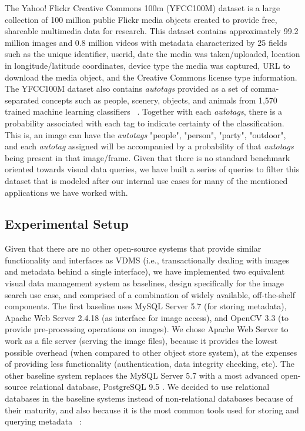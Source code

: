 The Yahoo! Flickr Creative Commons 100m (YFCC100M) dataset is a large
collection of 100 million public Flickr media objects created to provide free,
shareable multimedia data for research.
This dataset contains approximately 99.2 million images and 0.8 million videos
with metadata characterized by 25 fields such as the unique identifier, userid,
date the media was taken/uploaded, location in longitude/latitude coordinates,
device type the media was captured, URL to download the media object,
and the Creative Commons license type information.
The YFCC100M dataset also contains \textit{autotags}
provided as a set of comma-separated concepts such as people, scenery, objects,
and animals from 1,570 trained machine learning classifiers ~\cite{Thomee_2016}.
Together with each \textit{autotags}, there is a probability associated with
each tag to indicate certainty of the classification.
This is, an image can have the \textit{autotags} "people", "person", "party",
"outdoor", and each \textit{autotag} assigned will be accompanied by a
probability of that \textit{autotags} being present in that image/frame.
Given that there is no standard benchmark oriented towards visual data queries,
we have built a series of queries to filter this dataset that is modeled after
our internal use cases for many of the mentioned applications we have worked
with.

\subsection{Experimental Setup}
\label{setup}

Given that there are no other open-source systems that provide similar
functionality and interfaces as VDMS (i.e., transactionally dealing with images
and metadata behind a single interface), we have implemented two equivalent
visual data management system as baselines,
design specifically for the image search use case,
and comprised of a combination of widely available, off-the-shelf components.
The first baseline uses MySQL Server 5.7 (for storing metadata),
Apache Web Server 2.4.18 (as interface for image access), and
OpenCV 3.3 (to provide pre-processing operations on images).
We chose Apache Web Server to work as a file server (serving the image files),
because it provides the lowest possible overhead
(when compared to other object store system), at the expenses of providing less
functionality (authentication, data integrity checking, etc).
The other baseline system replaces the MySQL Server 5.7 with a
most advanced open-source relational database, PostgreSQL 9.5 \cite{postgresql}.
We decided to use relational databases in the baseline systems instead of
non-relational databases because of their maturity, and also because it is
the most common tools used for storing and querying metadata
~\cite{Jatana2012, li_2019}:

